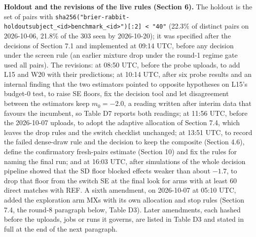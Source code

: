 \documentclass[
]{article}
\begin{document}
\textbf{Holdout and the revisions of the live rules (Section 6).} The
holdout is the set of pairs with
\texttt{sha256("brier-rabbit-holdout\textbar{}subject\_\textless{}id\textgreater{}\textbar{}benchmark\_\textless{}id\textgreater{}"){[}:2{]}\ \textless{}\ "40"}
(22.3\% of distinct pairs on 2026-10-06, 21.8\% of the 303 seen by
2026-10-20); it was specified after the decisions of Section 7.1 and
implemented at 09:14 UTC, before any decision under the screen rule (an
earlier mixture drop under the round-1 regime gate used all pairs). The
revisions: at 08:50 UTC, before the probe uploads, to add L15 and W20
with their predictions; at 10:14 UTC, after six probe results and an
internal finding that the two estimators pointed to opposite hypotheses
on L15's budget-0 test, to raise SE floors, fix the decision tool and
let disagreement between the estimators keep \(m_0 = -2.0\), a reading
written after interim data that favours the incumbent, so Table D7
reports both readings; at 11:56 UTC, before the 2026-10-07 uploads, to
adopt the adaptive allocation of Section 7.4, which leaves the drop
rules and the switch checklist unchanged; at 13:51 UTC, to record the
failed dense-draw rule and the decision to keep the composite (Section
4.6), define the confirmatory fresh-pairs estimate (Section 10) and fix
the rules for naming the final run; and at 16:03 UTC, after simulations
of the whole decision pipeline showed that the SD floor blocked effects
weaker than about \(-1.7\), to drop that floor from the switch SE at the
final look for arms with at least 60 direct matches with REF. A sixth
amendment, on 2026-10-07 at 05:10 UTC, added the exploration arm MXs
with its own allocation and stop rules (Section 7.4, the round-8
paragraph below, Table D3). Later amendments, each hashed before the
uploads, jobs or runs it governs, are listed in Table D3 and stated in
full at the end of the next paragraph.
\end{document}

